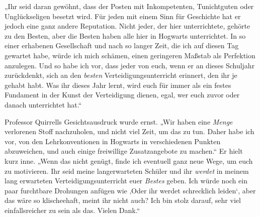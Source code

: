 „Ihr seid daran gewöhnt, dass der Posten mit Inkompetenten, Tunichtguten oder Unglückseligen besetzt wird. Für jeden mit einem Sinn für Geschichte hat er jedoch eine ganz andere Reputation. Nicht jeder, der hier unterrichtete, gehörte zu den Besten, aber die Besten haben alle hier in Hogwarts unterrichtet. In so einer erhabenen Gesellschaft und nach so langer Zeit, die ich auf diesen Tag gewartet habe, würde ich mich schämen, einen geringeren Maßstab als Perfektion anzulegen. Und so habe ich vor, dass jeder von euch, wenn er an dieses Schuljahr zurückdenkt, sich an den \emph{besten} Verteidigungsunterricht erinnert, den ihr je gehabt habt. Was ihr dieses Jahr lernt, wird euch für immer als ein festes Fundament in der Kunst der Verteidigung dienen, egal, wer euch zuvor oder danach unterrichtet hat.“

Professor Quirrells Gesichtsausdruck wurde ernst. „Wir haben eine \emph{Menge} verlorenen Stoff nachzuholen, und nicht viel Zeit, um das zu tun. Daher habe ich vor, von den Lehrkonventionen in Hogwarts in verschiedenen Punkten abzuweichen, und auch einige freiwillige Zusatzangebote zu machen.“ Er hielt kurz inne. „Wenn das nicht genügt, finde ich eventuell ganz neue Wege, um euch zu motivieren. Ihr seid meine langerwarteten Schüler und ihr \emph{werdet} in meinem lang erwarteten Verteidigungsunterricht euer \emph{Bestes} geben. Ich würde noch ein paar furchtbare Drohungen anfügen wie ‚Oder ihr werdet schrecklich leiden‘, aber das wäre so klischeehaft, meint ihr nicht auch? Ich bin stolz darauf, sehr viel einfallsreicher zu sein als das. Vielen Dank.“

